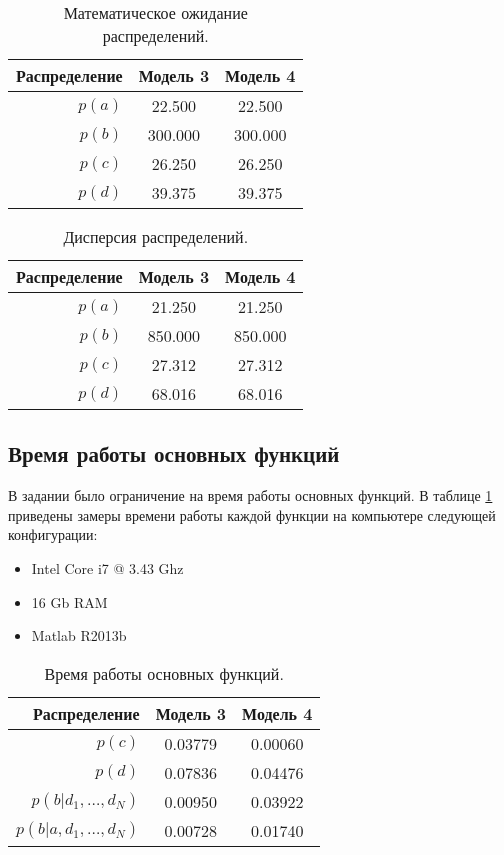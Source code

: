 \documentclass[12pt,a4paper]{article}
\begin{document}
\begin{table}[hbtp]
  \centering
  \begin{tabular}{r|c|c}
    Распределение & Модель 3 & Модель 4 \\ \hline
    $p(a)$ & 22.500 & 22.500 \\ \hline
    $p(b)$ & 300.000 & 300.000 \\ \hline
    $p(c)$ & 26.250 & 26.250 \\ \hline
    $p(d)$ & 39.375 & 39.375 \\ \hline
  \end{tabular}
  \caption{Математическое ожидание распределений.}
\end{table}
\begin{table}[hbtp]
  \centering
  \begin{tabular}{r|c|c}
    Распределение & Модель 3 & Модель 4\\ \hline
    $p(a)$ & 21.250 & 21.250 \\ \hline
    $p(b)$ & 850.000 & 850.000 \\ \hline
    $p(c)$ & 27.312 & 27.312 \\ \hline
    $p(d)$ & 68.016 & 68.016 \\ \hline
  \end{tabular}
  \caption{Дисперсия распределений.}
\end{table}

\paragraph{}

\subsection{Время работы основных функций}

В задании было ограничение на время работы основных функций.
В таблице \ref{tbl:time} приведены замеры времени работы каждой функции на компьютере следующей конфигурации:

\begin{itemize}
  \item Intel Core i7 @ 3.43 Ghz
  \item 16 Gb RAM
  \item Matlab R2013b
\end{itemize}

\begin{table}[hbtp]
  \centering
  \begin{tabular}{r|c|c}
    Распределение & Модель 3 & Модель 4 \\ \hline
    $p(c)$ & 0.03779 & 0.00060 \\ \hline
    $p(d)$ & 0.07836 & 0.04476 \\ \hline
    $p(b|d_1, \dots, d_N)$ & 0.00950 & 0.03922 \\ \hline
    $p(b|a, d_1, \dots, d_N)$ & 0.00728 & 0.01740 \\ \hline
  \end{tabular}
\caption{Время работы основных функций.}
\label{tbl:time}
\end{table}
\end{document}
